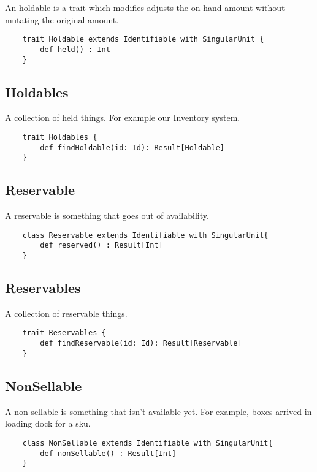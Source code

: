 \documentclass[11pt]{article}
\begin{document}
An holdable is a trait which modifies adjusts the on hand amount without mutating the original
amount.

\begin{lstlisting}
    trait Holdable extends Identifiable with SingularUnit { 
        def held() : Int
    }
\end{lstlisting}


\subsection{Holdables}

A collection of held things. For example our Inventory system.

\begin{lstlisting}
    trait Holdables { 
        def findHoldable(id: Id): Result[Holdable]
    }
\end{lstlisting}

\subsection{Reservable}

A reservable is something that goes out of availability. 

\begin{lstlisting}
    class Reservable extends Identifiable with SingularUnit{ 
        def reserved() : Result[Int]
    }
\end{lstlisting}

\subsection{Reservables}

A collection of reservable things. 

\begin{lstlisting}
    trait Reservables {
        def findReservable(id: Id): Result[Reservable]
    }
\end{lstlisting}

\subsection{NonSellable}

A non sellable is something that isn't available yet. For example, boxes arrived
in loading dock for a sku.

\begin{lstlisting}
    class NonSellable extends Identifiable with SingularUnit{ 
        def nonSellable() : Result[Int]
    }
\end{lstlisting}
\end{document}
